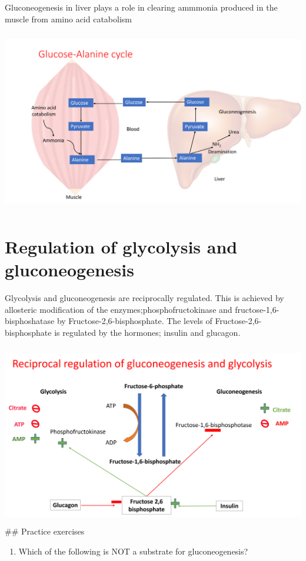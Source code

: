 \documentclass[
]{book}
\providecommand{\tightlist}{%
  \setlength{\itemsep}{0pt}\setlength{\parskip}{0pt}}
\begin{document}
Gluconeogenesis in liver plays a role in clearing ammmonia produced in the muscle from amino acid catabolism

\includegraphics[width=\textwidth,height=3.125in]{Images/alanine.png}

\section{Regulation of glycolysis and gluconeogenesis}\label{regulation-of-glycolysis-and-gluconeogenesis}

Glycolysis and gluconeogenesis are reciprocally regulated. This is achieved by allosteric modification of the enzymes;phosphofructokinase and fructose-1,6-bisphoshatase by Fructose-2,6-bisphosphate. The levels of Fructose-2,6-bisphosphate is regulated by the hormones; insulin and glucagon.

\includegraphics[width=\textwidth,height=3.125in]{Images/reg_gly_gluco.png}
\#\# Practice exercises

\begin{enumerate}
\def\labelenumi{\arabic{enumi}.}
\tightlist
\item
  Which of the following is NOT a substrate for gluconeogenesis?
\end{enumerate}
\end{document}
